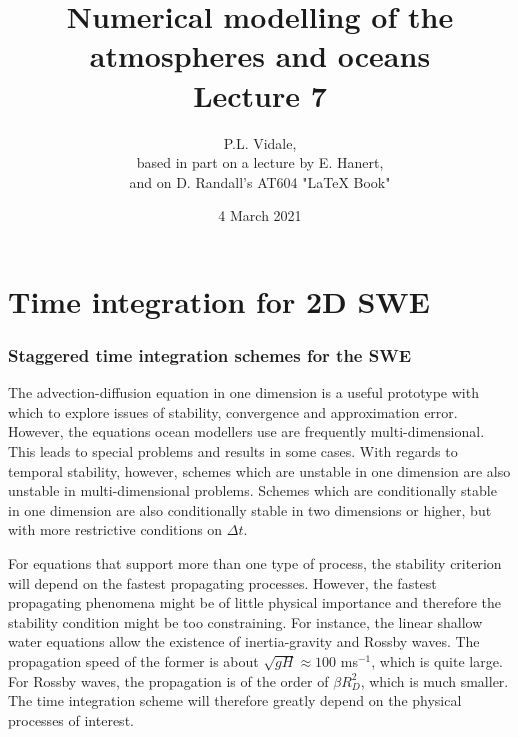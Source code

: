 \documentclass[xcolor=dvipsnames]{beamer} %
\title{Numerical modelling of the atmospheres and oceans \\ Lecture 7}
\author{P.L. Vidale, \\ 
	based in part on a lecture by E. Hanert,\\
	and on D. Randall's AT604 "LaTeX Book"}
\institute{
  Department of Meteorology\\
  University of Reading, UK\\
  p.l.vidale@reading.ac.uk}
\date{4 March 2021}
\newcommand{\BSS}{ \begin{scriptsize}}
\newcommand{\ESS}{ \end{scriptsize}}
\begin{document}
\frame{\titlepage}

\section[Outline]{}
\frame{\tableofcontents}



\section{Time integration for 2D SWE}
\frame
{
\frametitle{Staggered time integration schemes for the SWE}
\BSS
The advection-diffusion equation in one dimension is a useful prototype with which to explore issues of stability, convergence and approximation error. However, the equations ocean modellers use are frequently multi-dimensional. This leads to special problems and results in some cases. With regards to temporal stability, however, schemes which are unstable in one dimension are also unstable in multi-dimensional problems. Schemes which are conditionally stable in one dimension are also conditionally stable in two dimensions or higher, but with more restrictive conditions on $\Delta t$.

\vspace{0.2cm}For equations that support more than one type of process, the stability criterion will depend on the fastest propagating processes. However, the fastest propagating phenomena might be of little physical importance and therefore the stability condition might be too constraining. For instance, the linear shallow water equations allow the existence of inertia-gravity and Rossby waves. The propagation speed of the former is about $\sqrt{gH} \approx 100 $ ms$^{-1}$, which is quite large. For Rossby waves, the propagation is of the order of $\beta R_D^2$, which is much smaller. The time integration scheme will therefore greatly depend on the physical processes of interest. 

\hspace{2cm}
\ESS
}
\end{document}
